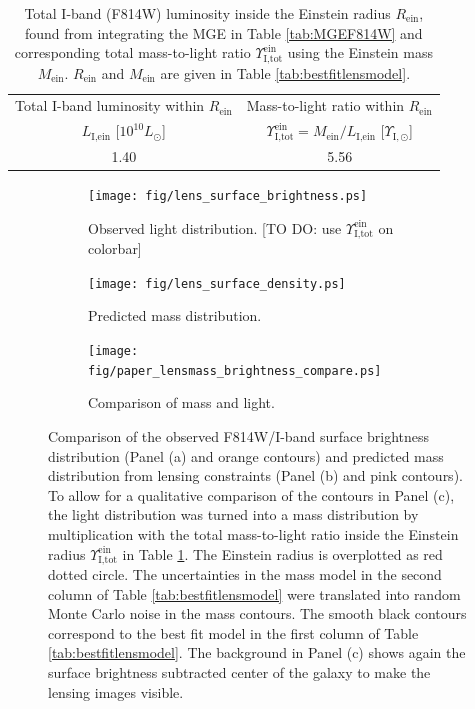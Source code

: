 
\begin{table}
\centering
\caption{Total I-band (F814W) luminosity inside the Einstein radius $R_\text{ein}$, found from integrating the MGE in Table \ref{tab:MGEF814W} and corresponding total mass-to-light ratio $\Upsilon_\text{I,tot}^\text{ein}$ using the Einstein mass $M_\text{ein}$. $R_\text{ein}$ and $M_\text{ein}$ are given in Table \ref{tab:bestfitlensmodel}.}
\begin{tabular}{cc}
\hline
Total I-band luminosity within $R_\text{ein}$ & Mass-to-light ratio within $R_\text{ein}$\\
 $L_\text{I,ein}$ [$10^{10} L_\odot$] & $\Upsilon_\text{I,tot}^\text{ein} = M_\text{ein} / L_\text{I,ein}$ [$\Upsilon_{\text{I},\odot}$]\\\hline
1.40 & 5.56\\\hline
\end{tabular}  
\label{tab:einsteinML} 
\end{table}


\begin{figure}
\centering
\begin{subfigure}{.3\textwidth}
  \centering
  \texttt{[image: fig/lens\_surface\_brightness.ps]}
  \caption{Observed light distribution. [TO DO: use $\Upsilon_\text{I,tot}^\text{ein}$ on colorbar]}
  \label{fig:lenscomparelight}
\end{subfigure}%
\begin{subfigure}{.3\textwidth}
  \centering
  \texttt{[image: fig/lens\_surface\_density.ps]}
  \caption{Predicted mass distribution.}
  \label{fig:lenscomparemass}
\end{subfigure}
\begin{subfigure}{.3\textwidth}
  \centering
  \texttt{[image: fig/paper\_lensmass\_brightness\_compare.ps]}
  \caption{Comparison of mass and light.}
  \label{fig:lenscompareboth}
\end{subfigure}
\caption{Comparison of the observed F814W/I-band surface brightness distribution (Panel (a) and orange contours) and predicted mass distribution from lensing constraints (Panel (b) and pink contours). To allow for a qualitative comparison of the contours in Panel (c), the light distribution was turned into a mass distribution by multiplication with the total mass-to-light ratio inside the Einstein radius $\Upsilon_\text{I,tot}^\text{ein}$ in Table \ref{tab:einsteinML}. The Einstein radius is overplotted as red dotted circle. The uncertainties in the mass model in the second column of Table \ref{tab:bestfitlensmodel} were translated into random Monte Carlo noise in the mass contours. The smooth black contours correspond to the best fit model in the first column of Table \ref{tab:bestfitlensmodel}. The background in Panel (c) shows again the surface brightness subtracted center of the galaxy to make the lensing images visible.}
\label{fig:lenslightcompareALL}
\end{figure}

